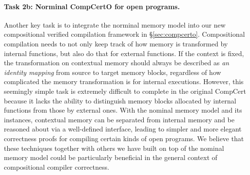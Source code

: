 \vspace*{-2ex}
\paragraph*{Task 2b: Norminal CompCertO for open programs.}
Another key task is to integrate the norminal memory model into our
new compositional verified compilation framework in
\S\ref{sec:compcerto}.  Compositional compilation needs to not only
keep track of how memory is transformed by internal functions, but
also do that for external functions.  If the context is fixed, the
transformation on contextual memory should always be described as
\emph{an identity mapping} from source to target memory blocks,
regardless of how complicated the memory transformation is for
internal executions.  However, this seemingly simple task is extremely
difficult to complete in the original CompCert because it lacks the
ability to distinguish memory blocks allocated by internal functions
from those by external ones. With the nominal memory model and its
instances, contextual memory can be separated from internal memory and
be reasoned about via a well-defined interface, leading to simpler and
more elegant correctness proofs for compiling certain kinds of open
programs. We believe that these techniques together with others we
have built on top of the nominal memory model could be particularly
beneficial in the general context of compositional compiler
correctness.

